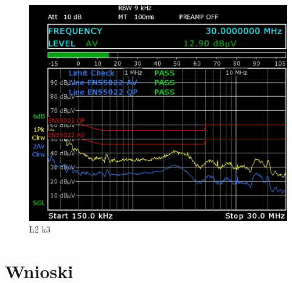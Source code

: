 \documentclass[12pt, a4paper, oneside]{article}
\begin{document}
\begin{figure}[h]
\centering
\caption{L2 k3}
\includegraphics[scale=0.28]{Linia2/k3.png}
\end{figure}
\clearpage
\section{Wnioski}
\end{document}
